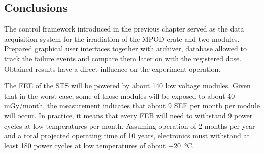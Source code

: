 \subsection{Conclusions}

\label{irradiation_results}
The control framework introduced in the previous chapter served as the data acquisition system for the irradiation of the MPOD crate and two modules. Prepared graphical user interfaces together with archiver, database allowed to track the failure events and compare them later on with the registered dose. Obtained results have a direct influence on the experiment operation.

The \gls{FEE} of the \gls{STS} will be powered by about 140 low voltage modules. Given that in the worst case, some of those modules will be exposed to about 40\,mGy/month, the measurement indicates that about 9 \gls{SEE} per month per module will occur. In practice, it means that every \gls{FEB} will need to withstand 9 power cycles at low temperatures per month. Assuming operation of 2 months per year and a total projected operating time of 10 years, electronics must withstand at least 180 power cycles at low temperatures of about \SI{-20}{\celsius}.
